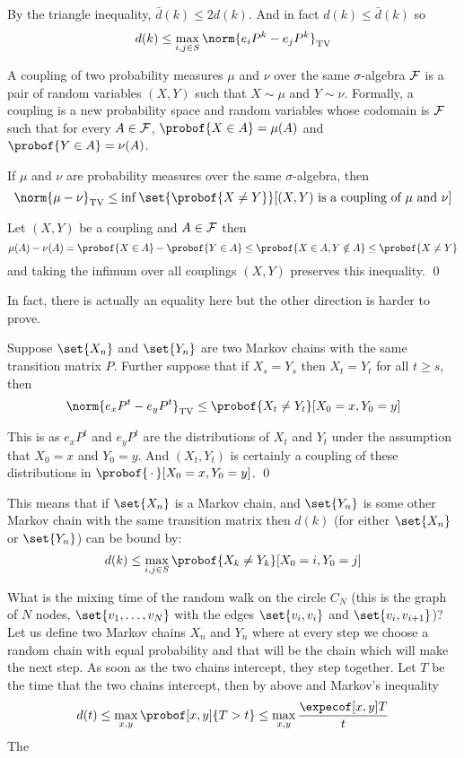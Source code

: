 \edefn

By the triangle inequality, $\bar d(k)\leq2d(k)$.
And in fact $d(k)\leq\bar d(k)$ so
$$ d(k) \leq \max_{i,j\in S}\norm{e_iP^k-e_jP^k}_{\rm TV} $$

\bdefn

    A {\emphcolor coupling} of two probability measures $\mu$ and $\nu$ over the same $\sigma$-algebra ${\cal F}$ is a pair of random variables $(X,Y)$ such that $X\sim\mu$ and $Y\sim\nu$.
    Formally, a coupling is a new probability space and random variables whose codomain is ${\cal F}$ such that for every $A\in{\cal F}$, $\probof{X\in A}=\mu(A)$ and $\probof{Y\in A}=\nu(A)$.

\edefn

\bprop

    If $\mu$ and $\nu$ are probability measures over the same $\sigma$-algebra, then
    $$ \norm{\mu-\nu}_{\rm TV} \leq \inf\set{\probof{X\neq Y}}[\hbox{$(X,Y)$ is a coupling of $\mu$ and $\nu$}] $$

\eprop

Let $(X,Y)$ be a coupling and $A\in{\cal F}$ then
$$ \mu(A) - \nu(A) = \probof{X\in A} - \probof{Y\in A} \leq \probof{X\in A,Y\notin A} \leq \probof{X\neq Y} $$
and taking the infimum over all couplings $(X,Y)$ preserves this inequality.
\qed

In fact, there is actually an equality here but the other direction is harder to prove.

\bthrm

    Suppose $\set{X_n}$ and $\set{Y_n}$ are two Markov chains with the same transition matrix $P$.
    Further suppose that if $X_s=Y_s$ then $X_t=Y_t$ for all $t\geq s$, then
    $$ \norm{e_xP^t-e_yP^t}_{\rm TV} \leq \probof{X_t\neq Y_t}[X_0=x,Y_0=y] $$

\ethrm

This is as $e_xP^t$ and $e_yP^t$ are the distributions of $X_t$ and $Y_t$ under the assumption that $X_0=x$ and $Y_0=y$.
And $(X_t,Y_t)$ is certainly a coupling of these distributions in $\probof{\,\cdot\,}[X_0=x,Y_0=y]$.
\qed

This means that if $\set{X_n}$ is a Markov chain, and $\set{Y_n}$ is some other Markov chain with the same transition matrix then $d(k)$ (for either $\set{X_n}$ or $\set{Y_n}$) can be bound by:
$$ d(k) \leq \max_{i,j\in S}\probof{X_k\neq Y_k}[X_0=i,Y_0=j] $$

\bexam

    What is the mixing time of the random walk on the circle $C_N$ (this is the graph of $N$ nodes, $\set{v_1,\dots,v_N}$ with the edges $\set{v_i,v_i}$ and $\set{v_i,v_{i+1}}$)?
    Let us define two Markov chains $X_n$ and $Y_n$ where at every step we choose a random chain with equal probability and that will be the chain which will make the next step.
    As soon as the two chains intercept, they step together.
    Let $T$ be the time that the two chains intercept, then by above and Markov's inequality
    $$ d(t) \leq \max_{x,y}\probof[x,y]{T>t} \leq \max_{x,y}\frac{\expecof[x,y]T}t $$
    The 

\eexam

\bye

